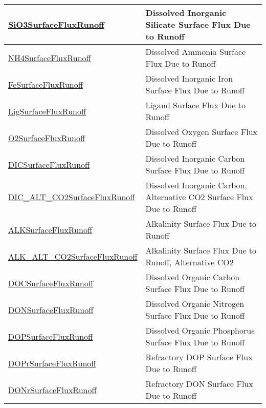 {\begin{center}
\begin{longtable}{| p{2.0in} | p{4.0in} |}
    \hline
    \hyperref[subsec:var_sec_forcing_SiO3SurfaceFluxRunoff]{SiO3SurfaceFluxRunoff} & Dissolved Inorganic Silicate Surface Flux Due to Runoff \\
    \hline
    \hyperref[subsec:var_sec_forcing_NH4SurfaceFluxRunoff]{NH4SurfaceFluxRunoff} & Dissolved Ammonia Surface Flux Due to Runoff \\
    \hline
    \hyperref[subsec:var_sec_forcing_FeSurfaceFluxRunoff]{FeSurfaceFluxRunoff} & Dissolved Inorganic Iron Surface Flux Due to Runoff \\
    \hline
    \hyperref[subsec:var_sec_forcing_LigSurfaceFluxRunoff]{LigSurfaceFluxRunoff} & Ligand Surface Flux Due to Runoff \\
    \hline
    \hyperref[subsec:var_sec_forcing_O2SurfaceFluxRunoff]{O2SurfaceFluxRunoff} & Dissolved Oxygen Surface Flux Due to Runoff \\
    \hline
    \hyperref[subsec:var_sec_forcing_DICSurfaceFluxRunoff]{DICSurfaceFluxRunoff} & Dissolved Inorganic Carbon Surface Flux Due to Runoff \\
    \hline
    \hyperref[subsec:var_sec_forcing_DIC_ALT_CO2SurfaceFluxRunoff]{DIC\_ALT\_CO2SurfaceFlux\-Runoff} & Dissolved Inorganic Carbon, Alternative CO2 Surface Flux Due to Runoff \\
    \hline
    \hyperref[subsec:var_sec_forcing_ALKSurfaceFluxRunoff]{ALKSurfaceFluxRunoff} & Alkalinity Surface Flux Due to Runoff \\
    \hline
    \hyperref[subsec:var_sec_forcing_ALK_ALT_CO2SurfaceFluxRunoff]{ALK\_ALT\_CO2SurfaceFlux\-Runoff} & Alkalinity Surface Flux Due to Runoff, Alternative CO2 \\
    \hline
    \hyperref[subsec:var_sec_forcing_DOCSurfaceFluxRunoff]{DOCSurfaceFluxRunoff} & Dissolved Organic Carbon Surface Flux Due to Runoff \\
    \hline
    \hyperref[subsec:var_sec_forcing_DONSurfaceFluxRunoff]{DONSurfaceFluxRunoff} & Dissolved Organic Nitrogen Surface Flux Due to Runoff \\
    \hline
    \hyperref[subsec:var_sec_forcing_DOPSurfaceFluxRunoff]{DOPSurfaceFluxRunoff} & Dissolved Organic Phosphorus Surface Flux Due to Runoff \\
    \hline
    \hyperref[subsec:var_sec_forcing_DOPrSurfaceFluxRunoff]{DOPrSurfaceFluxRunoff} & Refractory DOP Surface Flux Due to Runoff \\
    \hline
    \hyperref[subsec:var_sec_forcing_DONrSurfaceFluxRunoff]{DONrSurfaceFluxRunoff} & Refractory DON Surface Flux Due to Runoff \\

\end{longtable}
\end{center}}
